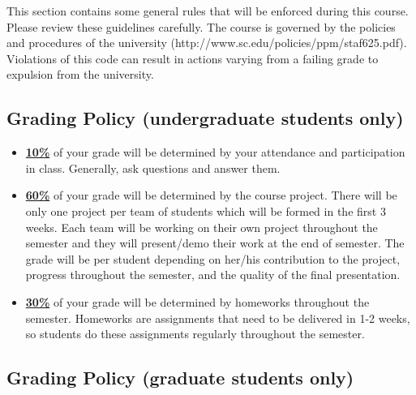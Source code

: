 \documentclass[11pt]{article}
\begin{document}
This section contains some general rules that will be enforced during this course. Please review these guidelines carefully. The course is governed by the policies and procedures of the university (http://www.sc.edu/policies/ppm/staf625.pdf). Violations of this code can result in actions varying from a failing grade to expulsion from the university.


\newpage

\subsection*{Grading Policy (undergraduate students only)}
\begin{itemize}
  \item \underline{\textbf{10\%}} of your grade will be determined by your attendance and participation in class. Generally, ask questions and answer them.

  \item \underline{\textbf{60\%}} of your grade will be determined by the course project. There will be only one project per team of students which will be formed in the first 3 weeks. Each team will be working on their own project throughout the semester and they will present/demo their work at the end of semester. The grade will be per student depending on her/his contribution to the project, progress throughout the semester, and the quality of the final presentation.

  \item \underline{\textbf{30\%}} of your grade will be determined by homeworks throughout the semester. Homeworks are assignments that need to be delivered in 1-2 weeks, so students do these assignments regularly throughout the semester.

\end{itemize}

\subsection*{Grading Policy (graduate students only)}
\end{document}
